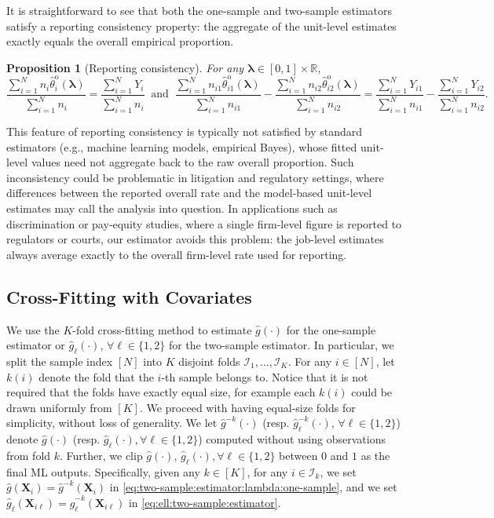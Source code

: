 \documentclass[12pt,letterpaper]{article}
\newtheorem{proposition}{Proposition}[section]
\begin{document}
It is straightforward to see that both the one-sample and two-sample estimators satisfy a reporting consistency property: the aggregate of the unit-level estimates exactly equals the overall empirical proportion.
\begin{proposition}[Reporting consistency]\label{prop:reporting:consistency}
For any $\boldsymbol{\lambda}\in[0,1]\times\mathbb{R}$,
$$\frac{\sum_{i=1}^Nn_i\hat{\theta}_i^{\mathrm{o}}(\boldsymbol{\lambda})}{\sum_{i=1}^Nn_i}=\frac{\sum_{i=1}^{N}Y_i}{\sum_{i=1}^{N}n_i}\ \mbox{ and }\ \frac{\sum_{i=1}^Nn_{i1}\hat{\theta}_{i1}^{\mathrm{o}}(\boldsymbol{\lambda})}{\sum_{i=1}^Nn_{i1}}-\frac{\sum_{i=1}^Nn_{i2}\hat{\theta}_{i2}^{\mathrm{o}}(\boldsymbol{\lambda})}{\sum_{i=1}^Nn_{i2}}=\frac{\sum_{i=1}^{N}Y_{i1}}{\sum_{i=1}^{N}n_{i1}}-\frac{\sum_{i=1}^{N}Y_{i2}}{\sum_{i=1}^{N}n_{i2}}.$$
\end{proposition}
This feature of reporting consistency is typically not satisfied by standard estimators (e.g., machine learning models, empirical Bayes), whose fitted unit-level values need not aggregate back to the raw overall proportion. Such inconsistency could be problematic in litigation and regulatory settings, where differences between the reported overall rate and the model-based unit-level estimates may call the analysis into question. In applications such as discrimination or pay‐equity studies, where a single firm-level figure is reported to regulators or courts, our estimator avoids this problem: the job-level estimates always average exactly to the overall firm-level rate used for reporting. 

\subsection{Cross-Fitting with Covariates}
We use the $K$-fold cross-fitting method to estimate $\hat{g}(\cdot)$ for the one-sample estimator or $\hat{g}_{\ell}(\cdot)$, $\forall\ell\in\{1,2\}$ for the two-sample estimator. In particular, we split the sample index $[N]$ into $K$ disjoint folds $\mathcal{I}_1,\ldots,\mathcal{I}_K$. For any $i\in[N]$, let $k(i)$ denote the fold that the $i$-th sample belongs to. Notice that it is not required that the folds have exactly equal size, for example each $k(i)$ could be drawn uniformly from $[K]$. We proceed with having equal-size folds for simplicity, without loss of generality. We let $\hat{g}^{-k}(\cdot)$ (resp. $\hat{g}_{\ell}^{-k}(\cdot)$, $\forall\ell\in\{1,2\}$) denote $\hat{g}(\cdot)$ (resp. $\hat{g}_{\ell}(\cdot), \forall\ell\in\{1,2\}$) computed without using observations from fold $k$. Further, we clip $\hat{g}(\cdot)$, $\hat{g}_{\ell}(\cdot), \forall\ell\in\{1,2\}$ between $0$ and $1$ as the final ML outputs. 
Specifically, given any $k\in[K]$, for any $i\in\mathcal{I}_k$, we set $\hat{g}(\mathbf{X}_i)=\hat{g}^{-k}(\mathbf{X}_i)$ in \eqref{eq:two-sample:estimator:lambda:one-sample}, and we set $\hat{g}_{\ell}(\mathbf{X}_{i\ell})=\hat{g}_{\ell}^{-k}(\mathbf{X}_{i\ell})$ in \eqref{eq:ell:two-sample:estimator}. 
\end{document}

